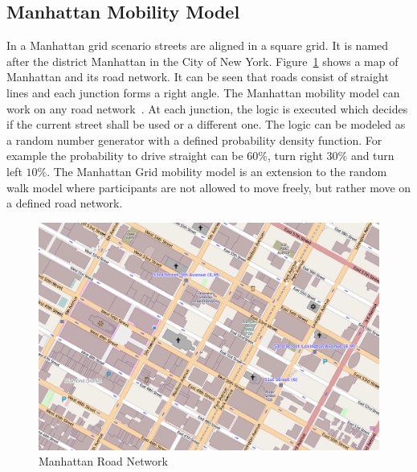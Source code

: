 \documentclass[master,english]{hgbthesis}
\begin{document}
\subsection{Manhattan Mobility Model}
In a Manhattan grid scenario streets are aligned in a square grid. It is named after the district Manhattan in the City of New York. Figure~\ref{fig:manhattan} shows a map of Manhattan and its road network. It can be seen that roads consist of straight lines and each junction forms a right angle.
The Manhattan mobility model can work on any road network~\cite{Zhou2004}. At each junction, the logic is executed which decides if the current street shall be used or a different one. The logic can be modeled as a random number generator with a defined probability density function. For example the probability to drive straight can be $60\%$, turn right $30\%$ and turn left $10\%$. The Manhattan Grid mobility model is an extension to the random walk model where participants are not allowed to move freely, but rather move on a defined road network.
\begin{figure}
	\centering
	\includegraphics[width=\linewidth]{./images/manhattan}
	\caption{Manhattan Road Network}
	\label{fig:manhattan}
\end{figure}
\end{document}

